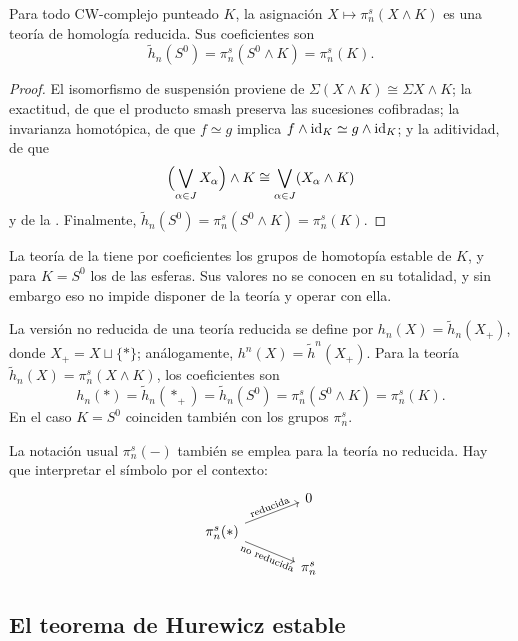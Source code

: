 \begin{prop}\label{prop:smash}
Para todo CW-complejo punteado $K$, la asignación $X\mapsto\pi_n^s(X\wedge K)$ es una teoría de homología reducida. Sus coeficientes son
\[
\tilde h_n(S^0)=\pi_n^s(S^0\wedge K)=\pi_n^s(K).
\]
\end{prop}
\begin{proof}
El isomorfismo de suspensión proviene de $\Sigma(X\wedge K)\cong\Sigma X\wedge K$; la exactitud, de que el producto smash preserva las sucesiones cofibradas; la invarianza homotópica, de que $f\simeq g$ implica $f\wedge\operatorname{id}_K\simeq g\wedge\operatorname{id}_K$; y la aditividad, de que
\[
\Bigl(\bigvee_{\alpha\in J}X_\alpha\Bigr)\wedge K\cong\bigvee_{\alpha\in J}(X_\alpha\wedge K)
\]
y de la . Finalmente, $\tilde h_n(S^0)=\pi_n^s(S^0\wedge K)=\pi_n^s(K)$.
\end{proof}

\begin{nota}
   La teoría de la  tiene por coeficientes los grupos de homotopía estable de $K$, y para $K=S^0$ los de las esferas. Sus valores no se conocen en su totalidad, y sin embargo eso no impide disponer de la teoría y operar con ella.
\end{nota}

\begin{nota}
   La versión no reducida de una teoría reducida se define por $h_n(X)=\tilde h_n(X_+)$, donde $X_+=X\sqcup\{*\}$; análogamente, $h^n(X)=\tilde h^n(X_+)$. Para la teoría $\tilde h_n(X)=\pi_n^s(X\wedge K)$, los coeficientes son
\[
h_n(*)=\tilde h_n(*_+)=\tilde h_n(S^0)=\pi_n^s(S^0\wedge K)=\pi_n^s(K).
\]
En el caso $K=S^0$ coinciden también con los grupos $\pi^s_n$. 

La notación usual $\pi_n^s(-)$ también se emplea para la teoría no reducida. Hay que interpretar el símbolo por el contexto:
\[
\begin{tikzcd}[column sep=large,row sep=small]
& 0\\
\pi_n^s(*) \arrow[ur,"\text{reducida}" sloped] \arrow[dr,"\text{no reducida}"' sloped] &\\
& \pi_n^s
\end{tikzcd}
\]
\end{nota}

\subsection{El teorema de Hurewicz estable}

